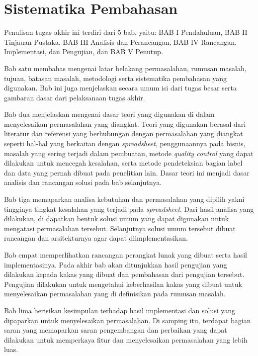 \section{Sistematika Pembahasan}

Penulisan tugas akhir ini terdiri dari 5 bab, yaitu: BAB I Pendahuluan, BAB II Tinjauan Pustaka, BAB III Analisis dan Perancangan, BAB IV Rancangan, Implementasi, dan Pengujian, dan BAB V Penutup. 

Bab satu membahas mengenai latar belakang permasalahan, rumusan masalah, tujuan, batasan masalah, metodologi serta sistematika pembahasan yang digunakan. Bab ini juga menjelaskan secara umum isi dari tugas besar serta gambaran dasar dari pelaksanaan tugas akhir.

Bab dua menjelaskan mengenai dasar teori yang digunakan di dalam menyelesaikan permasalahan yang diangkat. Teori yang digunakan berasal dari literatur dan referensi yang berhubungan dengan permasalahan yang diangkat seperti hal-hal yang berkaitan dengan \textit{spreadsheet}, penggunaannya pada bisnis, masalah yang sering terjadi dalam pembuatan, metode \textit{quality control} yang dapat dilakukan untuk mencegah kesalahan, serta metode pendeteksian bagian label dan data yang pernah dibuat pada penelitian lain. Dasar teori ini menjadi dasar analisis dan rancangan solusi pada bab selanjutnya.

Bab tiga memaparkan analisa kebutuhan dan permasalahan yang dipilih yakni tingginya tingkat kesalahan yang terjadi pada \textit{spreadsheet}. Dari hasil analisa yang dilakukan, di dapatkan bentuk solusi umum yang dapat digunakan untuk mengatasi permasalahan tersebut. Selanjutnya solusi umum tersebut dibuat rancangan dan arsitekturnya agar dapat diimplementasikan.

Bab empat memperlihatkan rancangan perangkat lunak yang dibuat serta hasil implementasinya. Pada akhir bab akan ditunjukkan hasil pengujian yang dilakukan kepada kakas yang dibuat dan pembahasan dari pengujian tersebut. Pengujian dilakukan untuk mengetahui keberhasilan kakas yang dibuat untuk menyelesaikan permasalahan yang di definisikan pada rumusan masalah.

Bab lima berisikan kesimpulan terhadap hasil implementasi dan solusi yang dipaparkan untuk menyelesaikan permasalahan. Di samping itu, terdapat bagian saran yang memaparkan saran pengembangan dan perbaikan yang dapat dilakukan untuk memperkaya fitur dan menyelesaikan permasalahan yang lebih luas.

